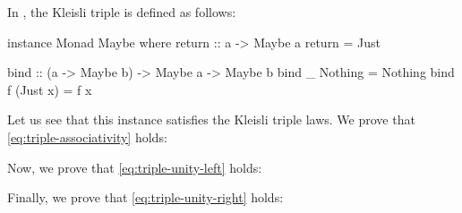 \begin{example}
  \label{ex:triple-maybe-haskell}

  In \hask, the  Kleisli triple is defined as
  follows:
  \begin{codehaskell}
instance Monad Maybe where
  return :: a -> Maybe a
  return = Just

  bind :: (a -> Maybe b) -> Maybe a -> Maybe b
  bind _ Nothing  = Nothing
  bind f (Just x) = f x
  \end{codehaskell}
  Let us see that this instance satisfies the Kleisli triple laws. We
  prove that \eqref{eq:triple-associativity} holds:

  \vspace{1em}
  \begin{steps}
  \end{steps}
  \begin{steps}
  \end{steps}
  Now, we prove that \eqref{eq:triple-unity-left} holds:
  \begin{steps}
  \end{steps}
  Finally, we prove that \eqref{eq:triple-unity-right} holds:

  \vspace{1em}
  \begin{steps}
  \end{steps}
  \begin{steps}
  \end{steps}

\end{example}

